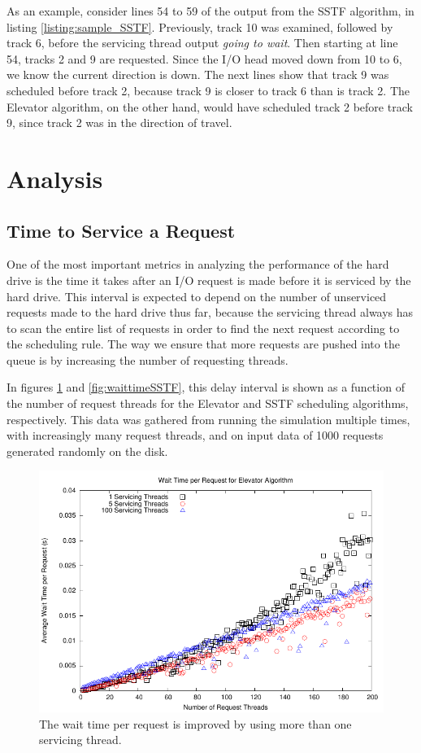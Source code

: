 \documentclass[12pt]{report}
\begin{document}
As an example, consider lines 54 to 59 of the output from the SSTF algorithm, in listing
\ref{listing:sample_SSTF}. Previously, track 10 was examined, followed by track 6, before
the servicing thread output \emph{going to wait}. Then starting at line 54, tracks 2 and 9
are requested. Since the I/O head moved down from 10 to 6, we know the current direction is
down. The next lines show that track 9 was scheduled before track 2, because track 9 is
closer to track 6 than is track 2. The Elevator algorithm, on the other hand, would have
scheduled track 2 before track 9, since track 2 was in the direction of travel.

\newpage
\section{Analysis} %
\subsection{Time to Service a Request}
One of the most important metrics in analyzing the performance of the hard drive is the
time it takes after an I/O request is made before it is serviced by the hard drive. This
interval is expected to depend on the number of unserviced requests made to the hard drive
thus far, because the servicing thread always has to scan the entire list of requests in
order to find the next request according to the scheduling rule. The way we ensure that
more requests are pushed into the queue is by increasing the number of requesting threads.

In figures
\ref{fig:waittimeElevator} and \ref{fig:waittimeSSTF}, this delay interval is shown as a 
function of the number of request threads for the Elevator and SSTF scheduling algorithms,
respectively.
This data was gathered from running the simulation multiple times, with increasingly many
request threads, and on input data of 1000 requests generated randomly on the disk.

\begin{figure}[htb!]
    \centering
    \includegraphics[scale=1]{waittimeElevator.pdf}
    \caption{The wait time per request is improved by using more than one servicing thread.}
    \label{fig:waittimeElevator}
\end{figure}
\end{document}
